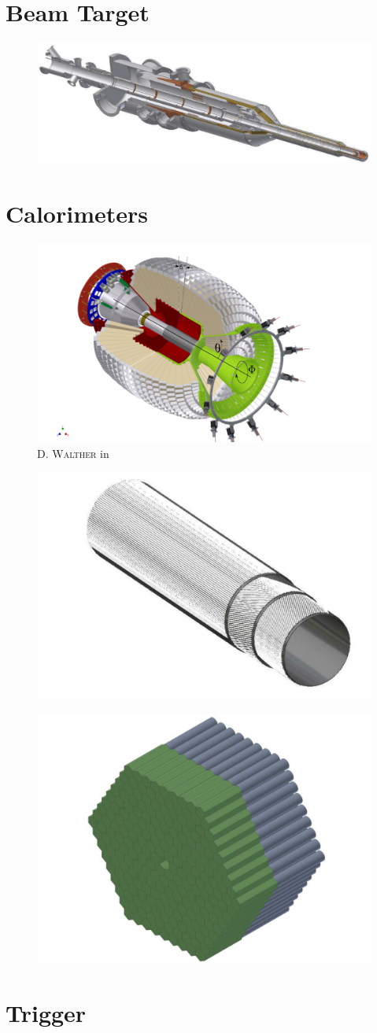 \section{Beam Target}

\begin{figure}[htbp]
	\centering
	\includegraphics[width=.5\linewidth]{figs/Target.pdf}
	\caption{\cite{cb}}
\end{figure}
\section{Calorimeters}
\begin{figure}[htbp]
	\centering
	\includegraphics[width=\linewidth]{figs/cb_fp_in.pdf}
	\caption{\textsc{D. Walther} in \cite{urban}}
\end{figure}
\begin{figure}[htbp]
	\centering
	\includegraphics[width=.5\linewidth]{figs/faserorient.pdf}
	\caption{\cite{cb}}
\end{figure}
\begin{figure}[htbp]
	\centering
	\includegraphics[width=.5\linewidth]{figs/mini-taps.pdf}
	\caption{\cite{cb}}
\end{figure}

\section{Trigger}